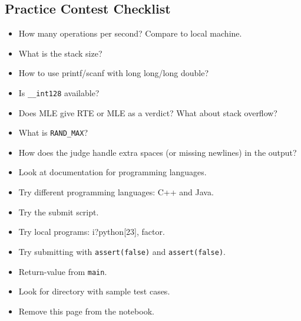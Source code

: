 \documentclass[9pt,a4paper,twocolumn,landscape,oneside]{amsart}
\begin{document}
\begin{multicols*}{3}
    \section*{Practice Contest Checklist}
        \begin{itemize}
            \item How many operations per second? Compare to local machine.
            \item What is the stack size?
            \item How to use printf/scanf with long long/long double?
            \item Is \texttt{\_{}\_{}int128} available?
            \item Does MLE give RTE or MLE as a verdict? What about stack overflow?
            \item What is \texttt{RAND\_{}MAX}?
            \item How does the judge handle extra spaces (or missing newlines) in the output?
            \item Look at documentation for programming languages.
            \item Try different programming languages: C++ and Java.
            \item Try the submit script.
            \item Try local programs: i?python[23], factor.
            \item Try submitting with \texttt{assert(false)} and \texttt{assert(false)}.
            \item Return-value from \texttt{main}.
            \item Look for directory with sample test cases.

            \item Remove this page from the notebook.
        \end{itemize}
\end{multicols*}
\end{document}
